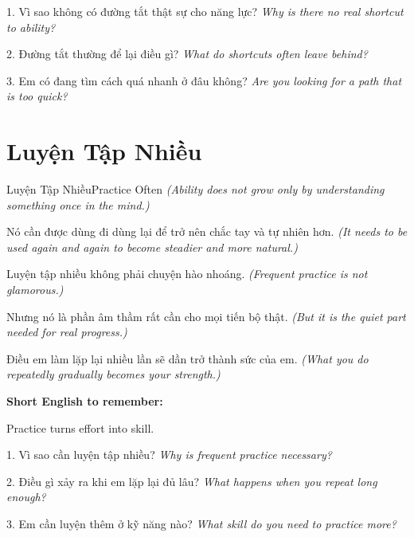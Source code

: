 \begin{tuhocnhanh}
1. Vì sao không có đường tắt thật sự cho năng lực? \textit{Why is there no real shortcut to ability?}

2. Đường tắt thường để lại điều gì? \textit{What do shortcuts often leave behind?}

3. Em có đang tìm cách quá nhanh ở đâu không? \textit{Are you looking for a path that is too quick?}
\end{tuhocnhanh}
\ngancach

\section{Luyện Tập Nhiều}
\begin{truyen}{Luyện Tập Nhiều}{Practice Often}
\textit{(Ability does not grow only by understanding something once in the mind.)}

Nó cần được dùng đi dùng lại để trở nên chắc tay và tự nhiên hơn.
\textit{(It needs to be used again and again to become steadier and more natural.)}

Luyện tập nhiều không phải chuyện hào nhoáng.
\textit{(Frequent practice is not glamorous.)}

Nhưng nó là phần âm thầm rất cần cho mọi tiến bộ thật.
\textit{(But it is the quiet part needed for real progress.)}
\end{truyen}

\begin{baihoc}
Điều em làm lặp lại nhiều lần sẽ dần trở thành sức của em.
\textit{(What you do repeatedly gradually becomes your strength.)}
\end{baihoc}

\begin{ghinhoanh}
\textbf{Short English to remember:}

Practice turns effort into skill.

\end{ghinhoanh}

\begin{tuhocnhanh}
1. Vì sao cần luyện tập nhiều? \textit{Why is frequent practice necessary?}

2. Điều gì xảy ra khi em lặp lại đủ lâu? \textit{What happens when you repeat long enough?}

3. Em cần luyện thêm ở kỹ năng nào? \textit{What skill do you need to practice more?}
\end{tuhocnhanh}
\ngancach

